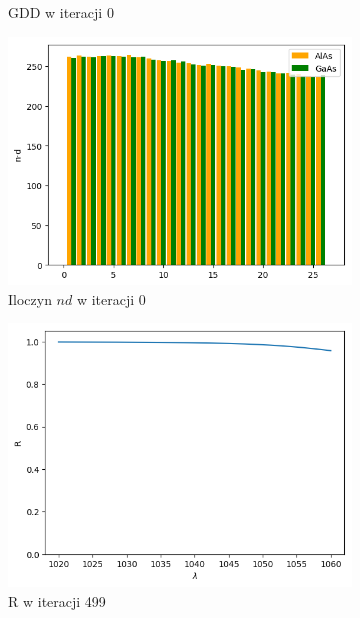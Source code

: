 \begin{figure} [H]
\begin{subfigure}[b]{0.31\textwidth}
        \caption{GDD w iteracji 0}
    \end{subfigure}
            \begin{subfigure}[b]{0.32\textwidth}
        \includegraphics[width=\linewidth]{figures/wyniki/losowe/dbr/result_ndresult0.png}
        \caption{Iloczyn $nd$ w iteracji 0}
    \end{subfigure}
        \begin{subfigure}[b]{0.30\textwidth}
        \includegraphics[width=\linewidth]{figures/wyniki/losowe/dbr/result_Rresult499.png}
        \caption{R w iteracji 499}
    \end{subfigure}
        \begin{subfigure}[b]{0.31\textwidth}

\end{subfigure}
\end{figure}
